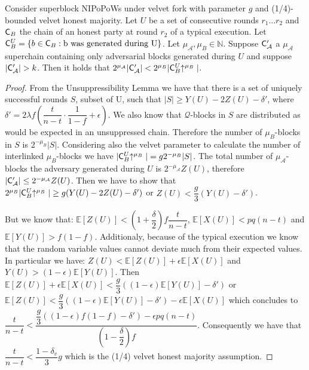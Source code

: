 \begin{lemma}
   Consider superblock NIPoPoWs under velvet fork with parameter $g$ and (1/4)-bounded velvet honest majority. Let $U$ be a set of consecutive rounds $r_1 ... r_2$ and $\mathsf{C}_B$ the chain of an honest party at round $r_2$ of a typical execution. Let $\mathsf{C}_B^U = \{b \in \mathsf{C}_B: \text{b was generated during U} \}$. Let $\mu_\mathcal{A}, \mu_B \in \mathbb{N}$. Suppose $\mathsf{C}'_\mathcal{A}$ a $\mu_\mathcal{A}$ superchain containing only adversarial blocks generated during $U$ and suppose $\vert \mathsf{C}'_\mathcal{A} \vert > k$. Then it holds that $ 2^{\mu_\mathcal{A}}\vert \mathsf{C}'_\mathcal{A} \vert < 2^{\mu_B}\vert \mathsf{C}_B^U\negthickspace\uparrow^{\mu_B} \vert $.
\end{lemma}
\begin{proof} From the Unsuppressibility Lemma we have that there is a set of uniquely successful rounds $S$, subset of U, such that $\vert S \vert \geq Y(U) - 2Z(U) - \delta'$, where $\delta' = 2 \lambda f (\dfrac{t}{n-t} \cdot \dfrac{1}{1-f} + \epsilon)$. We also know that $\mathcal{Q}$-blocks in $S$ are distributed as would be expected in an unsuppressed chain. Therefore the number of $\mu_B$-blocks in $S$ is $2^{-\mu_B} \vert S \vert$. Considering also the velvet parameter to calculate the number of interlinked $\mu_B$-blocks we have $\vert \mathsf{C}_B^U\negthickspace\uparrow^{\mu_B} \vert = g2^{-\mu_B} \vert S \vert$.  The total number of $\mu_\mathcal{A}$-blocks the adversary generated during $U$ is $2^{-\mu_\mathcal{A}}Z(U)$, therefore $\vert \mathsf{C}'_\mathcal{A} \vert \leq 2^{-\mu_\mathcal{A}}Z(U)$. Then we have to show that $2^{\mu_B}\vert \mathsf{C}_B^U\negthickspace\uparrow^{\mu_B} \vert \geq g ( Y(U) - 2Z(U) - \delta' ) $ or $Z(U) < \dfrac{g}{3}(Y(U) - \delta')$.

But we know that\cite{backbone}: $\mathbb{E}[Z(U)] < (1+\dfrac{\delta}{2})f\dfrac{t}{n-t}$, $\mathbb{E}[X(U)] < pq(n-t)$ and $\mathbb{E}[Y(U)] > f(1-f)$. Additionaly, because of the typical execution we know that the random variable values cannot deviate much from their expected values. In particular we have\cite{backbone}: $Z(U) < \mathbb{E}[Z(U)] + \epsilon \mathbb{E}[X(U)]$ and $Y(U) > (1-\epsilon)\mathbb{E}[Y(U)]$. Then $\mathbb{E}[Z(U)] + \epsilon\mathbb{E}[X(U)] < \dfrac{g}{3}( (1-\epsilon)\mathbb{E}[Y(U)] -\delta')$ or $\mathbb{E}[Z(U)]  < \dfrac{g}{3}( (1-\epsilon)\mathbb{E}[Y(U)] -\delta') - \epsilon\mathbb{E}[X(U)]$ which concludes to $\dfrac{t}{n-t} < \dfrac{\dfrac{g}{3}((1-\epsilon)f(1-f)-\delta') - \epsilon pq(n-t)}{(1-\dfrac{\delta}{2})f}$. Consequently we have that $\dfrac{t}{n-t} < \dfrac{1-\delta_v}{3}g$ which is the (1/4) velvet honest majority assumption.
\end{proof}